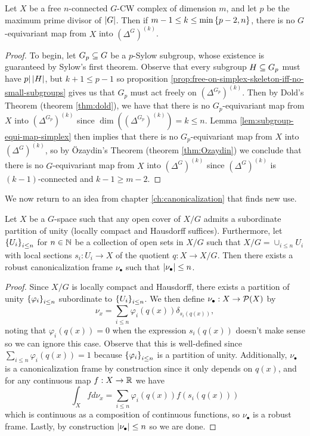 \begin{theorem}
    Let $X$ be a free $n$-connected $G$-CW complex of dimension $m$, and let $p$ be the maximum prime divisor of $\left| G \right|$.
    Then if $m - 1 \leq k \leq \min\left\{ p - 2,n \right\}$, there is no $G$-equivariant map from $X$ into $(\Delta^G)^{(k)}$.
    \begin{proof}
        To begin, let $G_p \subseteq G$ be a $p$-Sylow subgroup, whose existence is guaranteed by Sylow's first theorem.
        Observe that every subgroup $H \subseteq G_p$ must have $p | \left| H \right|$, but $k+1 \leq p-1$ so proposition \ref{prop:free-on-simplex-skeleton-iff-no-small-subgroups} gives us that $G_p$ must act freely on $(\Delta^{G_p})^{(k)}$.
        Then by Dold's Theorem (theorem \ref{thm:dold}), we have that there is no $G_p$-equivariant map from $X$ into $(\Delta^{G_p})^{(k)}$ since $\dim ((\Delta^{G_p})^{(k)}) = k \leq n$.
        Lemma \ref{lem:subgroup-equi-map-simplex} then implies that there is no $G_p$-equivariant map from $X$ into $(\Delta^G)^{(k)}$, so by \"Ozaydin's Theorem (theorem \ref{thm:Ozaydin}) we conclude that there is no $G$-equivariant map from $X$ into $(\Delta^G)^{(k)}$ since $(\Delta^{G})^{(k)}$ is $(k-1)$-connected and $k-1 \geq m-2$.
    \end{proof}
\end{theorem}

We now return to an idea from chapter \ref{ch:canonicalization} that finds new use.

\begin{proposition}\label{prop:secat-induces-frame}
    Let $X$ be a $G$-space such that any open cover of $X/G$ admits a subordinate partition of unity (locally compact and Hausdorff suffices).
    Furthermore, let $\left\{ U_i \right\}_{i \leq n}$ for $n \in \mathbb{N}$ be a collection of open sets in $X/G$ such that $X/G = \cup_{i \leq n} U_i$ with local sections $s_i : U_i \to X$ of the quotient $q : X \to X/G$.
    Then there exists a robust canonicalization frame $\nu_\bullet$ such that $\left| \nu_\bullet \right| \leq n$.
    \begin{proof}
        Since $X/G$ is locally compact and Hausdorff, there exists a partition of unity $\left\{ \varphi_i \right\}_{i \leq n}$ subordinate to $\left\{ U_i \right\}_{i \leq n}$.
        We then define $\nu_\bullet : X \to \mathcal{P}(X)$ by
        \[
            \nu_x = \sum_{i \leq n} \varphi_i(q(x)) \delta_{s_i(q(x))},
        \]
        noting that $\varphi_i(q(x)) = 0$ when the expression $s_i(q(x))$ doesn't make sense so we can ignore this case.
        Observe that this is well-defined since $\sum_{i \leq n} \varphi_i (q(x)) = 1$ because $\left\{ \varphi_i \right\}_{i \leq n}$ is a partition of unity.
        Additionally, $\nu_\bullet$ is a canonicalization frame by construction since it only depends on $q(x)$, and for any continuous map $f : X \to \mathbb{R}$ we have
        \[
            \int_X f d\nu_x
            = \sum_{i \leq n} \varphi_i(q(x)) f(s_i(q(x)))
        \]
        which is continuous as a composition of continuous functions, so $\nu_\bullet$ is a robust frame.
        Lastly, by construction $\left| \nu_\bullet \right| \leq n$ so we are done.
    \end{proof}
\end{proposition}



